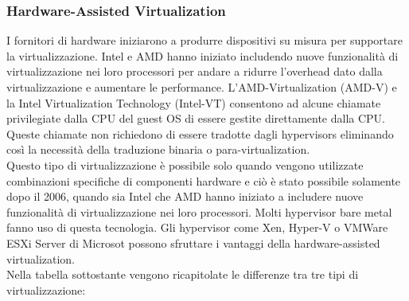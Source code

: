 \documentclass{article}
\begin{document}
\subsubsection{Hardware-Assisted Virtualization}
I fornitori di hardware iniziarono a produrre dispositivi su misura per supportare la virtualizzazione. Intel e AMD hanno iniziato includendo nuove funzionalità di virtualizzazione nei loro processori per andare a ridurre l’overhead dato dalla virtualizzazione e aumentare le performance. L'AMD-Virtualization (AMD-V) e la Intel Virtualization Technology (Intel-VT) consentono ad alcune chiamate privilegiate dalla CPU del guest OS di essere gestite direttamente dalla CPU. Queste chiamate non richiedono di essere tradotte dagli hypervisors eliminando così la necessità della traduzione binaria o para-virtualization. \\
Questo tipo di virtualizzazione è possibile solo quando vengono utilizzate combinazioni specifiche di componenti hardware e ciò è stato possibile solamente dopo il 2006, quando sia Intel che AMD hanno iniziato a includere nuove funzionalità di virtualizzazione nei loro processori. Molti hypervisor bare metal fanno uso di questa tecnologia. Gli hypervisor come Xen, Hyper-V o VMWare ESXi Server di Microsot possono sfruttare i vantaggi della hardware-assisted virtualization. \\
Nella tabella sottostante vengono ricapitolate le differenze tra tre tipi di virtualizzazione:
\end{document}

